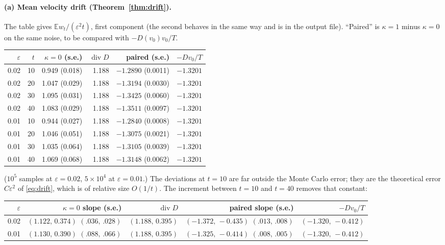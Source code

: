 \documentclass[11pt]{article}
\newcommand{\E}{\mathbb{E}}
\newcommand{\eps}{\varepsilon}
\newcommand{\Div}{\operatorname{div}}
\theoremstyle{remark}
\begin{document}
\paragraph{(a) Mean velocity drift (Theorem~\ref{thm:drift}).} The table
gives $\E w_t/(\eps^2t)$, first component (the second behaves in the same
way and is in the output file). ``Paired'' is $\kappa=1$ minus $\kappa=0$
on the same noise, to be compared with $-D(v_0)v_0/T$.
\begin{center}\small\setlength{\tabcolsep}{4pt}
\begin{tabular}{rr|rr|rr}
  $\eps$ & $t$ & $\kappa=0$ (s.e.) & $\Div D$ & paired (s.e.) & $-Dv_0/T$ \\ \hline
  0.02 & 10 & 0.949 (0.018) & 1.188 & $-1.2890$ (0.0011) & $-1.3201$ \\
  0.02 & 20 & 1.047 (0.029) & 1.188 & $-1.3194$ (0.0030) & $-1.3201$ \\
  0.02 & 30 & 1.095 (0.031) & 1.188 & $-1.3425$ (0.0060) & $-1.3201$ \\
  0.02 & 40 & 1.083 (0.029) & 1.188 & $-1.3511$ (0.0097) & $-1.3201$ \\
  0.01 & 10 & 0.944 (0.027) & 1.188 & $-1.2840$ (0.0008) & $-1.3201$ \\
  0.01 & 20 & 1.046 (0.051) & 1.188 & $-1.3075$ (0.0021) & $-1.3201$ \\
  0.01 & 30 & 1.035 (0.064) & 1.188 & $-1.3105$ (0.0039) & $-1.3201$ \\
  0.01 & 40 & 1.069 (0.068) & 1.188 & $-1.3148$ (0.0062) & $-1.3201$ \\
\end{tabular}
\end{center}
($10^5$ samples at $\eps=0.02$, $5\times10^4$ at $\eps=0.01$.) The
deviations at $t=10$ are far outside the Monte Carlo error; they are the
theoretical error $C\eps^2$ of \eqref{eq:drift}, which is of relative size
$O(1/t)$. The increment between $t=10$ and $t=40$ removes that constant:
\begin{center}\small\setlength{\tabcolsep}{4pt}
\begin{tabular}{r|rr|rr}
  $\eps$ & $\kappa=0$ slope (s.e.) & $\Div D$ & paired slope (s.e.) & $-Dv_0/T$ \\ \hline
  0.02 & $(1.122,\,0.374)$ $(.036,\,.028)$ & $(1.188,\,0.395)$
       & $(-1.372,\,-0.435)$ $(.013,\,.008)$ & $(-1.320,\,-0.412)$ \\
  0.01 & $(1.130,\,0.390)$ $(.088,\,.066)$ & $(1.188,\,0.395)$
       & $(-1.325,\,-0.414)$ $(.008,\,.005)$ & $(-1.320,\,-0.412)$ \\
\end{tabular}
\end{center}
\end{document}
